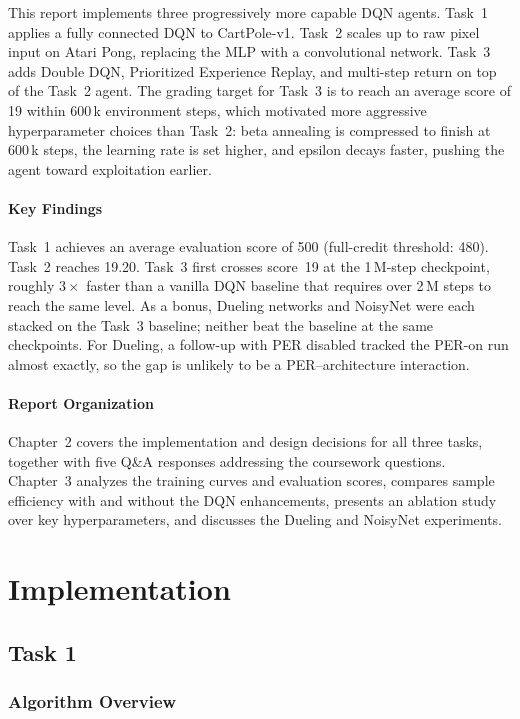 \documentclass[12pt,a4paper]{report}
\begin{document}
This report implements three progressively more capable DQN agents.
Task~1 applies a fully connected DQN to CartPole-v1.
Task~2 scales up to raw pixel input on Atari Pong, replacing the MLP with a
convolutional network.
Task~3 adds Double DQN, Prioritized Experience Replay, and multi-step return on top
of the Task~2 agent.
The grading target for Task~3 is to reach an average score of 19 within 600\,k
environment steps, which motivated more aggressive hyperparameter choices than
Task~2: beta annealing is compressed to finish at 600\,k steps, the learning rate
is set higher, and epsilon decays faster, pushing the agent toward exploitation earlier.

\subsubsection*{Key Findings}

Task~1 achieves an average evaluation score of 500 (full-credit threshold: 480).
Task~2 reaches 19.20.
Task~3 first crosses score~19 at the 1\,M-step checkpoint, roughly $3\times$ faster
than a vanilla DQN baseline that requires over 2\,M steps to reach the same level.
As a bonus, Dueling networks and NoisyNet were each stacked on the Task~3 baseline; neither
beat the baseline at the same checkpoints. For Dueling, a follow-up with PER disabled
tracked the PER-on run almost exactly, so the gap is unlikely to be a PER--architecture
interaction.

\subsubsection*{Report Organization}

Chapter~2 covers the implementation and design decisions for all three tasks, together
with five Q\&A responses addressing the coursework questions.
Chapter~3 analyzes the training curves and evaluation scores, compares sample
efficiency with and without the DQN enhancements, presents an ablation study over
key hyperparameters, and discusses the Dueling and NoisyNet experiments.

\chapter{Implementation}
\section{Task 1}

\subsection{Algorithm Overview}
\end{document}
